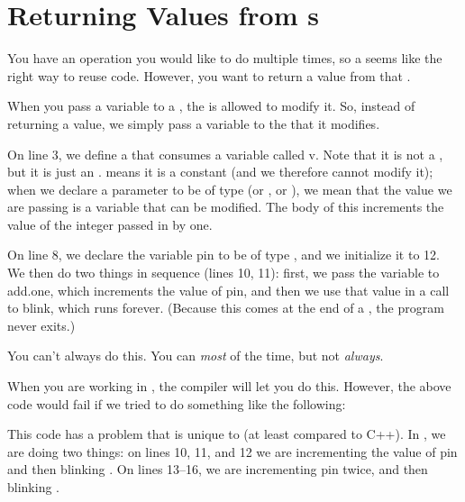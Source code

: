% 
\section{Returning Values from {\PROC}s}
\problem
You have an operation you would like to do multiple times, so a \PROC seems like the right way to reuse code. However, you want to return a value from that \PROC.

\solution
When you pass a variable to a \PROC, the \PROC is allowed to modify it. So, instead of returning a value, we simply pass a variable to the \PROC that it modifies.



\discussion
On line 3, we define a \PROC that consumes a variable called {\code v}. Note that it is not a \VALINT, but it is just an \INT. \VALINT means it is a constant (and we therefore cannot modify it); when we declare a parameter to be of type \INT (or \BOOL, or \BYTE), we mean that the value we are passing is a variable that can be modified. The body of this \PROC increments the value of the integer passed in by one.

On line 8, we declare the variable {\code pin} to be of type \INT, and we initialize it to 12. We then do two things in sequence (lines 10, 11): first, we pass the variable to {\code add.one}, which increments the value of {\code pin}, and then we use that value in a call to {\code blink}, which runs forever. (Because this comes at the end of a \SEQ, the program never exits.)

You can't always do this. You can \emph{most} of the time, but not \emph{always}.

When you are working in \SEQuence, the compiler will let you do this. However, the above code would fail if we tried to do something like the following:



This code has a problem that is unique to \occam (at least compared to C++). In \PARallel, we are doing two things: on lines 10, 11, and 12 we are incrementing the value of {\code pin} and then blinking \pintwelve. On lines 13--16, we are incrementing {\code pin} twice, and then blinking \pinthirteen.

